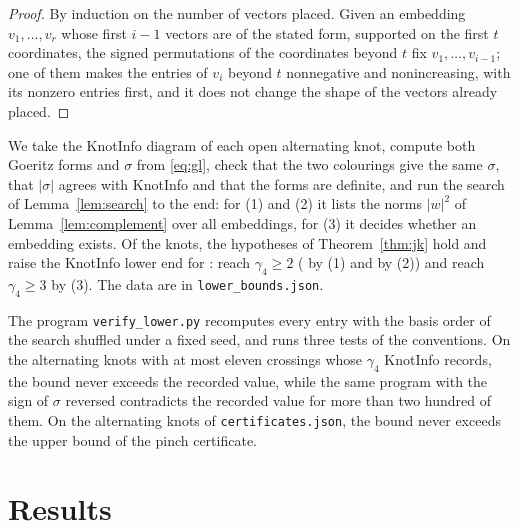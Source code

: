 \documentclass[11pt]{amsart}
\theoremstyle{definition}
\theoremstyle{remark}
\begin{document}
\begin{proof}
By induction on the number of vectors placed. Given an embedding $v_1,\dots,v_r$ whose first
$i-1$ vectors are of the stated form, supported on the first $t$ coordinates, the signed
permutations of the coordinates beyond $t$ fix $v_1,\dots,v_{i-1}$; one of them makes the
entries of $v_i$ beyond $t$ nonnegative and nonincreasing, with its nonzero entries first,
and it does not change the shape of the vectors already placed.
\end{proof}

We take the KnotInfo diagram of each open alternating knot, compute both Goeritz forms and
$\sigma$ from \eqref{eq:gl}, check that the two colourings give the same $\sigma$, that
$|\sigma|$ agrees with KnotInfo and that the forms are definite, and run the search of
Lemma~\ref{lem:search} to the end: for (1) and (2) it lists the norms $|w|^2$ of
Lemma~\ref{lem:complement} over all embeddings, for (3) it decides whether an embedding
exists. Of the \ntotal{} knots, the hypotheses of Theorem~\ref{thm:jk} hold and raise the
KnotInfo lower end for \nlower{}: \nlowertwo{} reach $\gamma_4\ge2$ (\nlowerten{} by (1)
and \nlowertwelve{} by (2)) and \nlowerthree{} reach $\gamma_4\ge3$ by (3). The data are in
\texttt{lower\_bounds.json}.

The program \texttt{verify\_lower.py} recomputes every entry with the basis order of the
search shuffled under a fixed seed, and runs three tests of the conventions. On the
alternating knots with at most eleven crossings whose $\gamma_4$ KnotInfo records, the bound
never exceeds the recorded value, while the same program with the sign of $\sigma$ reversed
contradicts the recorded value for more than two hundred of them. On the alternating knots
of \texttt{certificates.json}, the bound never exceeds the upper bound of the pinch
certificate.

\section{Results}

\begin{table}[htbp]
\centering
\countstable
\caption{Open entries of $\gamma_4$ in KnotInfo 2026.10.5 and what the certificates give.
``Settled'': the value is now known; ``lowered'': the upper bound is lower.}
\label{tab:counts}
\end{table}

\begin{table}[htbp]
\centering
\selftesttable
\caption{Corrupted certificates rejected by the verifier.}
\label{tab:selftest}
\end{table}
\end{document}
